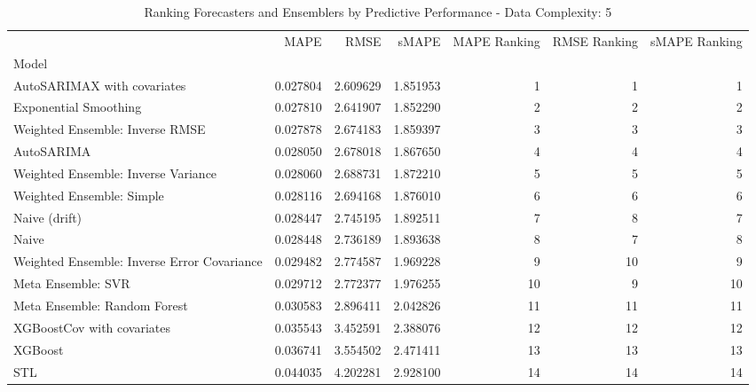 \begin{table}
\caption{Ranking Forecasters and Ensemblers by Predictive Performance - Data Complexity: 5}
\begin{tabular}{lrrrrrr}
\toprule
 & MAPE & RMSE & sMAPE & MAPE Ranking & RMSE Ranking & sMAPE Ranking \\
Model &  &  &  &  &  &  \\
\midrule
AutoSARIMAX with covariates & 0.027804 & 2.609629 & 1.851953 & 1 & 1 & 1 \\
Exponential Smoothing & 0.027810 & 2.641907 & 1.852290 & 2 & 2 & 2 \\
Weighted Ensemble: Inverse RMSE & 0.027878 & 2.674183 & 1.859397 & 3 & 3 & 3 \\
AutoSARIMA & 0.028050 & 2.678018 & 1.867650 & 4 & 4 & 4 \\
Weighted Ensemble: Inverse Variance & 0.028060 & 2.688731 & 1.872210 & 5 & 5 & 5 \\
Weighted Ensemble: Simple & 0.028116 & 2.694168 & 1.876010 & 6 & 6 & 6 \\
Naive (drift) & 0.028447 & 2.745195 & 1.892511 & 7 & 8 & 7 \\
Naive & 0.028448 & 2.736189 & 1.893638 & 8 & 7 & 8 \\
Weighted Ensemble: Inverse Error Covariance & 0.029482 & 2.774587 & 1.969228 & 9 & 10 & 9 \\
Meta Ensemble: SVR & 0.029712 & 2.772377 & 1.976255 & 10 & 9 & 10 \\
Meta Ensemble: Random Forest & 0.030583 & 2.896411 & 2.042826 & 11 & 11 & 11 \\
XGBoostCov with covariates & 0.035543 & 3.452591 & 2.388076 & 12 & 12 & 12 \\
XGBoost & 0.036741 & 3.554502 & 2.471411 & 13 & 13 & 13 \\
STL & 0.044035 & 4.202281 & 2.928100 & 14 & 14 & 14 \\
\bottomrule
\end{tabular}
\end{table}
